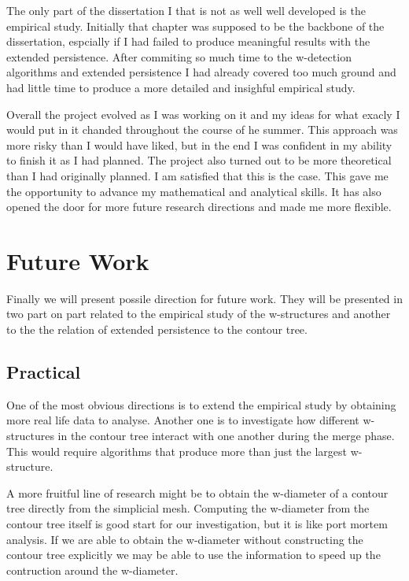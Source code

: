 The only part of the dissertation I that is not as well well developed is the empirical study. Initially that chapter was supposed to be the backbone of the dissertation, espcially if I had failed to produce meaningful results with the extended persistence. After commiting so much time to the w-detection algorithms and extended persistence I had already covered too much ground and had little time to produce a more detailed and insighful empirical study.

Overall the project evolved as I was working on it and my ideas for what exacly I would put in it chanded throughout the course of he summer. This approach was more risky than I would have liked, but in the end I was confident in my ability to finish it as I had planned. The project also turned out to be more theoretical than I had originally planned. I am satisfied that this is the case. This gave me the opportunity to advance my mathematical and analytical skills. It has also opened the door for more future research directions and made me more flexible.



\section{Future Work}

Finally we will present possile direction for future work. They will be presented in two part on part related to the empirical study of the w-structures and another to the the relation of extended persistence to the contour tree.

\subsection{Practical}

One of the most obvious directions is to extend the empirical study by obtaining more real life data to analyse. Another one is to investigate how different w-structures in the contour tree interact with one another during the merge phase. This would require algorithms that produce more than just the largest w-structure.

A more fruitful line of research might be to obtain the w-diameter of a contour tree directly from the simplicial mesh. Computing the w-diameter from the contour tree itself is good start for our investigation, but it is like port mortem analysis. If we are able to obtain the w-diameter without constructing the contour tree explicitly we may be able to use the information to speed up the contruction around the w-diameter.

